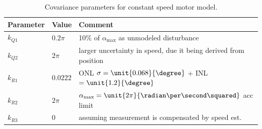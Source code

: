 \documentclass[12pt,a4paper,oneside,openany]{article}
\begin{document}
\begin{table}[htbp]
\caption{Covariance parameters for constant speed motor model.}
\begin{center}
\begin{tabular}{llp{}} \toprule
 Parameter & Value & Comment \\
\midrule
$k_{Q1}$ & $0.2\pi$ & \unit{10}{\%} of $\alpha_{\textrm{max}}$ as unmodeled disturbance\\
$k_{Q2}$ & $2\pi$ & larger uncertainty in speed, due it being derived from position\\
$k_{R1}$ & $0.0222$  & ONL $\sigma = \unit{0.068}{\degree}$ + INL $ = \unit{1.2}{\degree}$\\
$k_{R2}$ & $2\pi$ & $\alpha_{\textrm{max}} = \unit{2\pi}{\radian\per\second\squared}$ acc limit \\
$k_{R3}$ & $0$ & assuming measurement is compensated by speed est. \\
\bottomrule
\end{tabular}
\end{center}
\label{tab:cov-params-const-speed}
\end{table}%


\nocite{*}

%
%
\printbibliography
\end{document}
